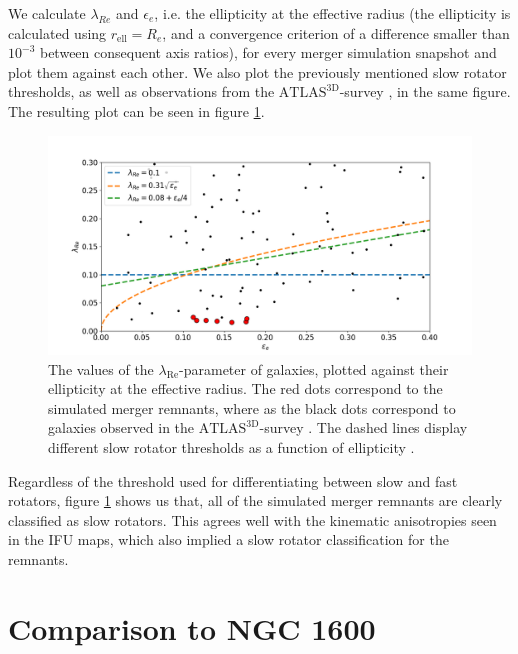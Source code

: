 \documentclass[english, oneside]{HYgradu}
\begin{document}
We calculate $\lambda_{Re}$ and $\epsilon_e$, i.e. the ellipticity at the effective radius (the ellipticity is calculated using $r_\mathrm{ell} = R_e$, and a convergence criterion of a difference smaller than $10^{-3}$ between consequent axis ratios), for every merger simulation snapshot and plot them against each other. We also plot the previously mentioned slow rotator thresholds, as well as observations from the $\mathrm{ATLAS^{3D}}$-survey \citep{Cappellari2011}, in the same figure. The resulting plot can be seen in figure \ref{figure:lambda_epsilon}. 

\begin{figure}[h]
	\centering
	\includegraphics[width=\textwidth]{lambda_epsilon.png}
	\caption{The values of the $\lambda_{\mathrm{Re}}$-parameter of galaxies, plotted against their ellipticity at the effective radius. The red dots correspond to the simulated merger remnants, where as the black dots correspond to galaxies observed in the $\mathrm{ATLAS^{3D}}$-survey \citep{Cappellari2011, Emsellem2011}. The dashed lines display different slow rotator thresholds as a function of ellipticity \citep{Emsellem2007, Emsellem2011, Cappellari2016}.}
	\label{figure:lambda_epsilon}
\end{figure}

Regardless of the threshold used for differentiating between slow and fast rotators, figure \ref{figure:lambda_epsilon} shows us that, all of the simulated merger remnants are clearly classified as slow rotators. This agrees well with the kinematic anisotropies seen in the IFU maps, which also implied a slow rotator classification for the remnants.

\section{Comparison to NGC 1600}
\end{document}
